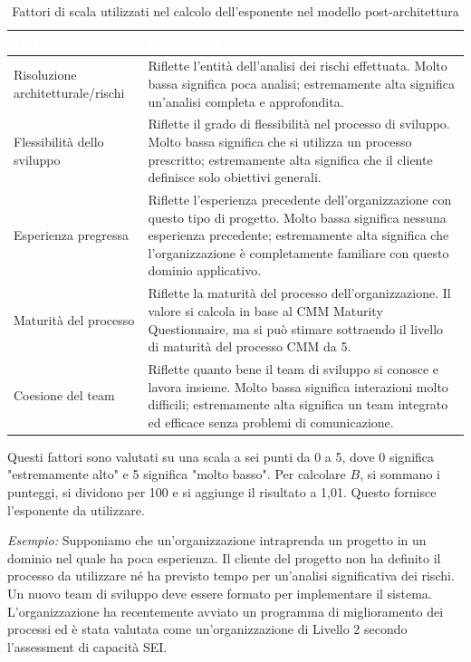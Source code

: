 \begin{table}[ht]
\centering
{}
\begin{tabular}{|p{4cm}|p{10.5cm}|}
\hline
\rowcolor{headerblue}
\textbf{\textcolor{white}{Fattore di scala}} & \textbf{\textcolor{white}{Descrizione}} \\\hline
Risoluzione architetturale/rischi & Riflette l'entità dell'analisi dei rischi effettuata. Molto bassa significa poca analisi; estremamente alta significa un'analisi completa e approfondita.\\\hline
Flessibilità dello sviluppo & Riflette il grado di flessibilità nel processo di sviluppo. Molto bassa significa che si utilizza un processo prescritto; estremamente alta significa che il cliente definisce solo obiettivi generali.\\\hline
Esperienza pregressa & Riflette l'esperienza precedente dell'organizzazione con questo tipo di progetto. Molto bassa significa nessuna esperienza precedente; estremamente alta significa che l'organizzazione è completamente familiare con questo dominio applicativo.\\\hline
Maturità del processo & Riflette la maturità del processo dell'organizzazione. Il valore si calcola in base al CMM Maturity Questionnaire, ma si può stimare sottraendo il livello di maturità del processo CMM da 5.\\\hline
Coesione del team & Riflette quanto bene il team di sviluppo si conosce e lavora insieme. Molto bassa significa interazioni molto difficili; estremamente alta significa un team integrato ed efficace senza problemi di comunicazione.
\\\hline
\end{tabular}
\caption{Fattori di scala utilizzati nel calcolo dell'esponente nel modello post-architettura}
\label{tab:scale-factors-exponent-computation-post-architecture-model}
\end{table}

Questi fattori sono valutati su una scala a sei punti da 0 a 5, dove 0 significa "estremamente alto" e 5 significa "molto basso". Per calcolare $B$, si sommano i punteggi, si dividono per 100 e si aggiunge il risultato a 1,01. Questo fornisce l'esponente da utilizzare.

\textit{Esempio:} Supponiamo che un'organizzazione intraprenda un progetto in un dominio nel quale ha poca esperienza. Il cliente del progetto non ha definito il processo da utilizzare né ha previsto tempo per un'analisi significativa dei rischi. Un nuovo team di sviluppo deve essere formato per implementare il sistema. L'organizzazione ha recentemente avviato un programma di miglioramento dei processi ed è stata valutata come un'organizzazione di Livello 2 secondo l'assessment di capacità SEI.

